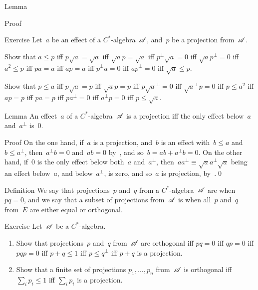 \documentclass[a]{subfiles}
\begin{document}
\begin{parsec}
\begin{point}[ad-contraposed]{Lemma}
\begin{point}{Proof}
\end{point}
\end{point}
\begin{point}{Exercise}%
Let~$a$ be an effect of a $C^*$-algebra~$\mathscr{A}$,
and~$p$ be a projection from~$\mathscr{A}$.
\begin{point}%
Show that $a\leq p$
iff $p\sqrt{a} = \sqrt{a}$
iff $\sqrt{a}p = \sqrt{a}$
iff $p^\perp\sqrt{a} = 0$
iff $\sqrt{a}p^\perp = 0$
iff $a^2\leq p$
iff $p a  = a$
iff $ a p = a $
iff $p^\perp a  = 0$
iff $ap^\perp = 0$
iff $\sqrt{a}\leq p$.
\end{point}
\begin{point}%
Show that $p\leq a$
iff $p \sqrt{a} = p$
iff $\sqrt{a} p = p$
iff $ p\sqrt{a}^\perp = 0$
iff $\sqrt{a}^\perp p = 0$
iff $p\leq a^2$
iff $ap=p$
iff $pa = p$
iff $pa^\perp =0$
iff $a^\perp p =0$
iff $p\leq \sqrt{a}$.
\end{point}
\end{point}
\begin{point}{Lemma}%
An effect~$a$ of a $C^*$-algebra~$\mathscr{A}$
is a projection iff the only effect
below~$a$ and~$a^\perp$ is~$0$.
\begin{point}{Proof}%
On the one hand,
if~$a$ is a projection,
and~$b$ is an effect with~$b\leq a$
and~$b\leq a^\perp$,
then~$a^\perp b=0$ and~$ab=0$ by~,
and so~$b=ab+a^\perp b = 0$.
On the other hand,
if~$0$ is the only effect below both~$a$ and~$a^\perp$,
then~$aa^\perp\equiv \sqrt{a}a^\perp \sqrt{a}$
being an effect below~$a$, and below~$a^\perp$,
is zero, and so~$a$ is projection, by~.\qed
\end{point}
\end{point}
\begin{point}{Definition}%
We say that projections~$p$ and~$q$
from a $C^*$-algebra~$\mathscr{A}$ are 
when~$pq=0$,
and we say that a subset of projections
from~$\mathscr{A}$ is 
when all~$p$ and~$q$ from~$E$
are either equal or orthogonal.
\end{point}
\begin{point}{Exercise}%
Let~$\mathscr{A}$ be a $C^*$-algebra.
\begin{enumerate}
\item
Show that projections~$p$ and~$q$ from~$\mathscr{A}$
are orthogonal iff $pq=0$ iff $qp=0$ iff $pqp=0$
iff $p+q\leq 1$ iff $p\leq q^\perp$
iff $p+q$ is a projection.
\item
Show that a finite set of  projections $p_1,\dotsc,p_n$
from~$\mathscr{A}$ is orthogonal
iff~$\sum_i p_i \leq 1$
iff $\sum_i p_i$ is a projection.


\end{enumerate}
\end{point}
\end{parsec}
\end{document}
